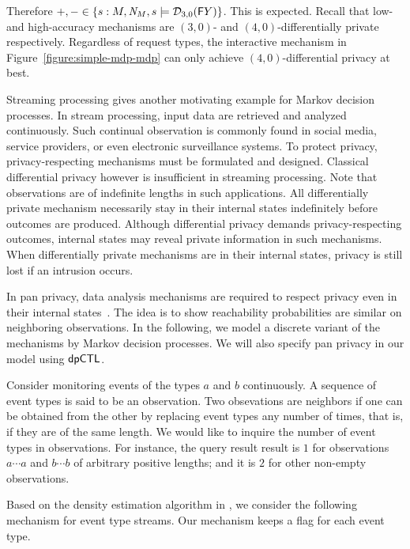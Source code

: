 Therefore $+, - \in \{ s : M, \mathit{N}_{M}, s \models \mathcal{D}_{{3}, {0}}
(\mathsf{F} Y) \}$. This is expected. Recall that low- and high-accuracy
mechanisms are $(3, 0)$- and $(4, 0)$-differentially private
respectively. Regardless of request types, the interactive mechanism
in Figure~\ref{figure:simple-mdp-mdp} can only achieve $(4,
0)$-differential privacy at best.


Streaming processing gives another motivating example for Markov
decision processes. In stream processing, input data are retrieved and
analyzed continuously. Such continual observation is commonly found
in social media, service providers, or even electronic surveillance
systems. To protect privacy, privacy-respecting mechanisms must be
formulated and designed. Classical differential privacy however is
insufficient in streaming processing. Note that observations are of
indefinite lengths in such applications. All differentially private
mechanism necessarily stay in their internal states indefinitely
before outcomes are produced. Although differential privacy demands
privacy-respecting outcomes, internal states may reveal private
information in such mechanisms. When differentially private mechanisms
are in their internal states, privacy is still lost if an intrusion
occurs.

In pan privacy, data analysis mechanisms are required to respect
privacy even in their internal states~\cite{DNPR:10:DPCO,DNPRY:10:PPSA}. 
The idea is to show reachability probabilities are similar on
neighboring observations. In the following, we model a discrete
variant of the mechanisms by Markov decision processes. We will also
specify pan privacy in our model using $\textsf{dpCTL}$.

Consider monitoring events of the types $a$ and $b$ continuously.
A sequence of event types is said to be an observation. Two
obsevations are {neighbors} if one can be obtained from the other 
by replacing event types any number of times, that is, if they are of
the same length.  
We would like to inquire the number of event types in
observations. For instance, the query result result is $1$ 
for observations $a \cdots a$ and $b \cdots b$ of arbitrary positive
lengths; and it is $2$ for other non-empty observations. 

Based on the density estimation algorithm in \cite{DNPRY:10:PPSA}, we
consider the following mechanism for event type streams. Our mechanism
keeps a flag for each event type. 


